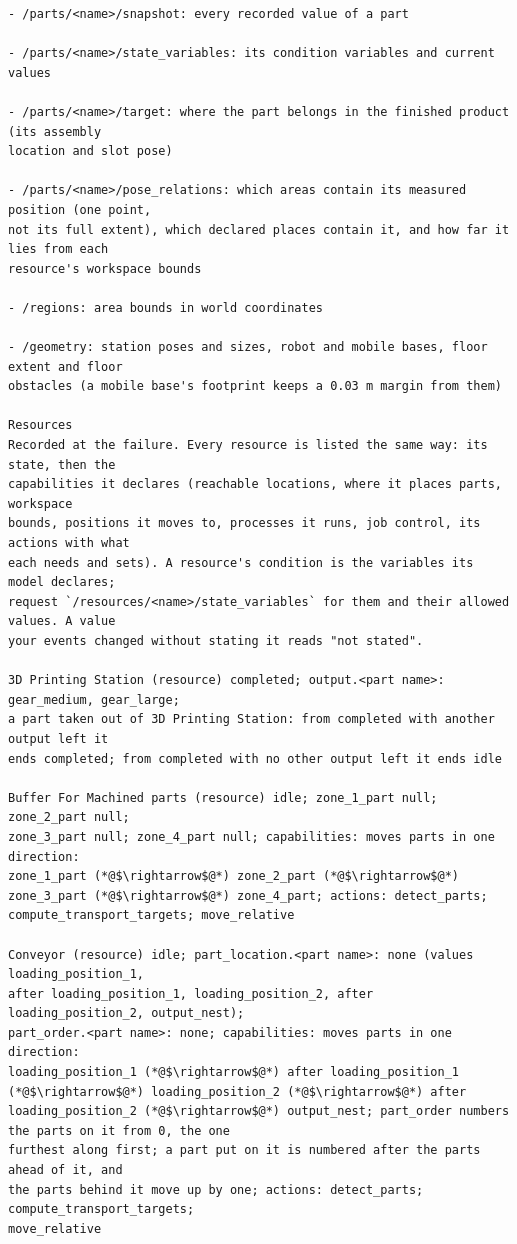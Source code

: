 \documentclass[preprint,12pt,authoryear]{elsarticle}
\begin{document}
\begin{lstlisting}[style=recorded]
- /parts/<name>/snapshot: every recorded value of a part

- /parts/<name>/state_variables: its condition variables and current values

- /parts/<name>/target: where the part belongs in the finished product (its assembly
location and slot pose)

- /parts/<name>/pose_relations: which areas contain its measured position (one point,
not its full extent), which declared places contain it, and how far it lies from each
resource's workspace bounds

- /regions: area bounds in world coordinates

- /geometry: station poses and sizes, robot and mobile bases, floor extent and floor
obstacles (a mobile base's footprint keeps a 0.03 m margin from them)

Resources
Recorded at the failure. Every resource is listed the same way: its state, then the
capabilities it declares (reachable locations, where it places parts, workspace
bounds, positions it moves to, processes it runs, job control, its actions with what
each needs and sets). A resource's condition is the variables its model declares;
request `/resources/<name>/state_variables` for them and their allowed values. A value
your events changed without stating it reads "not stated".

3D Printing Station (resource) completed; output.<part name>: gear_medium, gear_large;
a part taken out of 3D Printing Station: from completed with another output left it
ends completed; from completed with no other output left it ends idle

Buffer For Machined parts (resource) idle; zone_1_part null; zone_2_part null;
zone_3_part null; zone_4_part null; capabilities: moves parts in one direction:
zone_1_part (*@$\rightarrow$@*) zone_2_part (*@$\rightarrow$@*) zone_3_part (*@$\rightarrow$@*) zone_4_part; actions: detect_parts;
compute_transport_targets; move_relative

Conveyor (resource) idle; part_location.<part name>: none (values loading_position_1,
after loading_position_1, loading_position_2, after loading_position_2, output_nest);
part_order.<part name>: none; capabilities: moves parts in one direction:
loading_position_1 (*@$\rightarrow$@*) after loading_position_1 (*@$\rightarrow$@*) loading_position_2 (*@$\rightarrow$@*) after
loading_position_2 (*@$\rightarrow$@*) output_nest; part_order numbers the parts on it from 0, the one
furthest along first; a part put on it is numbered after the parts ahead of it, and
the parts behind it move up by one; actions: detect_parts; compute_transport_targets;
move_relative


\end{lstlisting}
\end{document}
